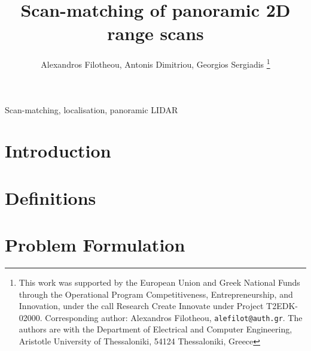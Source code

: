 \documentclass[letterpaper, 10 pt, conference]{ieeeconf}
\begin{document}
\title{\LARGE \bf Scan-matching of panoramic 2D range scans}


\author{Alexandros Filotheou, Antonis Dimitriou, Georgios Sergiadis%
  \thanks{This work was supported by the European Union and Greek National Funds
  through the Operational Program Competitiveness, Entrepreneurship, and
  Innovation, under the call Research Create Innovate under Project T2EDK-02000.
  Corresponding author: Alexandros Filotheou, {\tt\small alefilot@auth.gr}.
  The authors are with the Department of Electrical and Computer Engineering,
  Aristotle University of Thessaloniki, 54124 Thessaloniki, Greece}
}

\maketitle
\thispagestyle{empty}
\pagestyle{empty}


\begin{abstract}
  
\end{abstract}

\begin{keywords}
Scan-matching, localisation, panoramic LIDAR
\end{keywords}

\section{Introduction}
  

\section{Definitions}
  \label{section:definitions}
  

\section{Problem Formulation}
  \label{section:the_problem}
  

\end{document}
